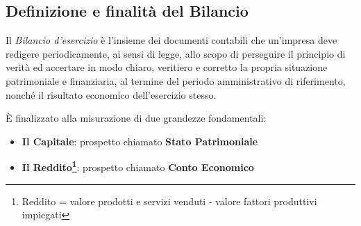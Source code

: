 \subsection{Definizione e finalità del Bilancio}
Il \textit{Bilancio d'esercizio} è l'insieme dei documenti contabili che un’impresa deve redigere periodicamente, ai sensi di legge, allo scopo di perseguire il principio di verità ed accertare in modo chiaro, veritiero e corretto la propria situazione patrimoniale e finanziaria, al termine del periodo amministrativo di riferimento, nonché il risultato economico dell'esercizio stesso.

È finalizzato alla misurazione di due grandezze fondamentali:
\begin{itemize}
	\item \textbf{Il Capitale}: prospetto chiamato \textbf{Stato Patrimoniale}
	\item \textbf{Il Reddito\footnote{Reddito = valore prodotti e servizi venduti - valore fattori produttivi impiegati}}: prospetto chiamato \textbf{Conto Economico}
\end{itemize}

